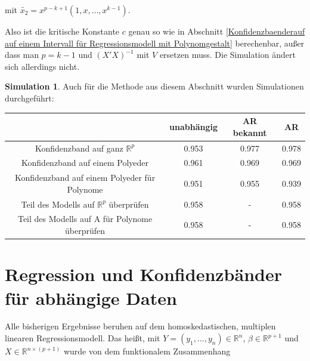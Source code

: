 \documentclass[12pt,a4paper]{article}
\theoremstyle{definition}
\theoremstyle{definition}
\theoremstyle{definition}
\newtheorem{Simulation}[Definition]{Simulation}
\theoremstyle{definition}
\newcommand{\UeberRR}{0.953}
\newcommand{\UeberRMinmax}{0.961}
\newcommand{\UeberRMinmaxPolyfast}{0.951}
\newcommand{\UeberARbekanntR}{0.977}
\newcommand{\UeberARbekanntMinmax}{0.969}
\newcommand{\UeberARbekanntMinmaxPolyfast}{0.955}
\newcommand{\UeberARR}{0.978}
\newcommand{\UeberARMinmax}{0.969}
\newcommand{\UeberARMinmaxPolyfast}{0.939}
\newcommand{\UeberRRpruefen}{0.958}
\newcommand{\UeberRMinmaxPolyfastpruefen}{0.958}
\newcommand{\UeberARbekanntRpruefen}{-}
\newcommand{\UeberARbekanntMinmaxPolyfastpruefen}{-}
\newcommand{\UeberARRpruefen}{0.958}
\newcommand{\UeberARMinmaxPolyfastpruefen}{0.958}
\begin{document}
mit $\tilde{x_2}= x^{p-k+1}(1, x, \ldots, x^{k-1})$.

Also ist die kritische Konstante $c$ genau so wie in Abschnitt \ref{Konfidenzbaenderauf auf einem Intervall für Regressionsmodell mit Polynomgestalt} berechenbar, außer dass man $p=k-1$ und $(X'X)^{-1}$ mit $V$ ersetzen muss. Die Simulation ändert sich allerdings nicht.

\begin{Simulation}
Auch für die Methode aus diesem Abschnitt wurden Simulationen durchgeführt:

\begin{center}
\begin{tabular}{|c|c|c|c|}
\hline 
& unabhängig & AR bekannt & AR \\ 
\hline 
Konfidenzband auf ganz $\mathbb{R}^{p}$		 & \UeberRR		  & \UeberARbekanntR & \UeberARR \\ 
\hline 
Konfidenzband auf einem Polyeder	 & \UeberRMinmax  & \UeberARbekanntMinmax & \UeberARMinmax \\ 
\hline 
Konfidenzband auf einem Polyeder für Polynome  & \UeberRMinmaxPolyfast & \UeberARbekanntMinmaxPolyfast & \UeberARMinmaxPolyfast \\ 
\hline 
Teil des Modells auf $\mathbb{R}^{p}$ überprüfen 	& \UeberRRpruefen & \UeberARbekanntRpruefen & \UeberARRpruefen \\ 
\hline 
Teil des Modells auf A für Polynome überprüfen	& \UeberRMinmaxPolyfastpruefen & \UeberARbekanntMinmaxPolyfastpruefen & \UeberARMinmaxPolyfastpruefen \\ 
\hline 
\end{tabular} 
\end{center}

\end{Simulation}





\newpage
\section{Regression und Konfidenzbänder für abhängige Daten}
\label{Regression und Konfidenzbänder für abhaengige Daten}
Alle bisherigen Ergebnisse beruhen auf dem homoskedastischen, multiplen linearen Regressionsmodell. Das heißt, mit $Y=(y_1, \ldots, y_n) \in \mathbb{R}^n$, $\beta \in \mathbb{R}^{p+1}$ und $X \in \mathbb{R}^{n \times (p+1)}$ wurde von dem funktionalem Zusammenhang
\end{document}
